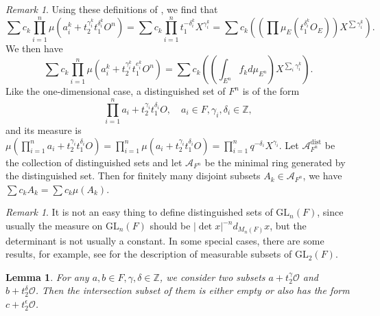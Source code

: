 \documentclass{amsart}
\newtheorem{lemma}[theorem]{Lemma}
\theoremstyle{definition}
\theoremstyle{remark}
\newtheorem{remark}[theorem]{Remark}
\numberwithin{equation}{section}
\def  \GL        {\mathrm{GL}}
\def  \ca       {\mathcal{A}}
\def  \co       {\mathcal{O}}
\def  \bz       {\mathbb{Z}}
\begin{document}
\begin{remark}
	Using these definitions of \cite{morrow2008integration}, we find that
	$$
\sum c_k \prod_{i=1}^n  \mu (a^k_i+  t_2^{\gamma^k_i}t_1^{\delta^k_i}   O^n )  =  \sum c_k\prod_{i=1}^n   t_1^{-\delta^k_i} X^{\gamma^k_i}=  \sum c_k \left ((\prod  \mu_E(t_1^{\delta^k_i}  O_E))  X^{\sum \gamma^k_i} \right).
	$$
We then have
	$$
	\sum c_k \prod_{i=1}^n  \mu (a^k_i+  t_2^{\gamma^k_i}t_1^{e^k_i}   O^n ) = \sum c_k \left( (\int_{E^n}  f_k d \mu_{E^n} )   X^{\sum_i \gamma^k_i}   \right).
	$$
Like the one-dimensional case,  a distinguished set of $F^n$ is of the form
 	$$
    \prod_{i=1}^n  a_i  +  t_2^{\gamma_i}t_1^{\delta_i} O,   \quad   a_i \in F , \gamma_i, \delta_i \in  \bz,
 	$$
 	and its measure is $\mu(  \prod_{i=1}^n  a_i  +  t_2^{\gamma_i}t_1^{\delta_i} O)  = \prod_{i=1}^n \mu( a_i  +  t_2^{\gamma_i}t_1^{\delta_i} O) = \prod_{i=1}^n q^{-\delta_i} X^{\gamma_i}$.   Let $\ca^{\mathrm{dist}}_{F^n}$ be the collection of distinguished sets and let $\ca_{F^n}$ be the minimal ring generated by the distinguished set. Then for finitely  many disjoint  subsets $A_k \in \ca_{F^n}$, we have $\sum  c_k A_k  = \sum c_k \mu (A_k)$.
\end{remark}

\begin{remark}
	 It is not an easy  thing to define distinguished sets of $\GL_n(F)$, since usually the measure on $\GL_n (F)$ should be  $ |\det x|^{-n}  d_{M_n(F)} x$, but the determinant is not usually a constant.  In some special cases, there  are some results,  for example, see \cite{waller2019measure} for the description of measurable subsets of $\GL_2(F)$.
\end{remark}

\begin{lemma}\label{basicintersection}
	   For any $a, b \in F, \gamma, \delta \in \bz$,  we consider   two subsets $a+t_2^{\gamma} \co$ and $b+ t_2^{\delta} \co $.  Then the intersection  subset of them  is either empty or also has the form $c + t_2^{\epsilon} \co$.
\end{lemma}
\end{document}
